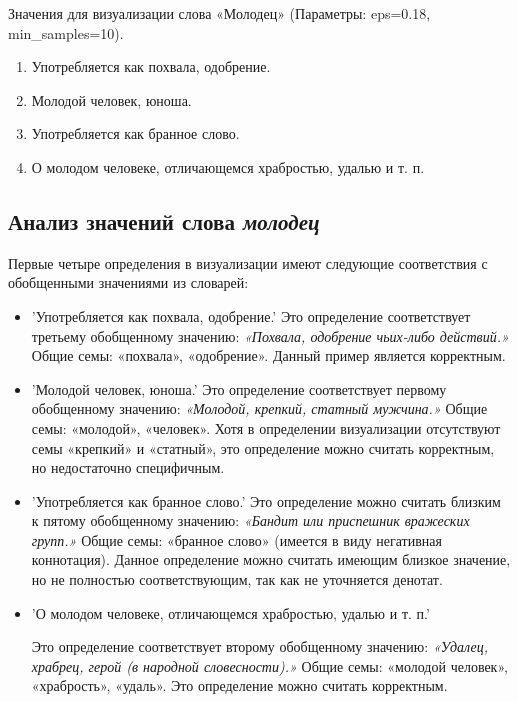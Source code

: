 Значения для визуализации слова «Молодец» (Параметры: eps=0.18, min\_samples=10).

\begin{enumerate}
    \item Употребляется как похвала, одобрение.
    \item Молодой человек, юноша.
    \item Употребляется как бранное слово.
    \item О молодом человеке, отличающемся храбростью, удалью и т. п.
\end{enumerate}

\subsection*{Анализ значений слова \textit{молодец}}

Первые четыре определения в визуализации имеют следующие соответствия с обобщенными значениями из словарей:

\begin{itemize}
    \item ’Употребляется как похвала, одобрение.’
Это определение соответствует третьему обобщенному значению:
\textit{«Похвала, одобрение чьих-либо действий.»} Общие семы: «похвала», «одобрение». Данный пример является корректным.

    \item ’Молодой человек, юноша.’
    Это определение соответствует первому обобщенному значению:
    \textit{«Молодой, крепкий, статный мужчина.»}
    Общие семы: «молодой», «человек».
    Хотя в определении визуализации отсутствуют семы «крепкий» и «статный», это определение можно считать корректным, но недостаточно специфичным.

    \item ’Употребляется как бранное слово.’
    Это определение можно считать близким к пятому обобщенному значению:
    \textit{«Бандит или приспешник вражеских групп.»}
    Общие семы: «бранное слово» (имеется в виду негативная коннотация).
    Данное определение можно считать имеющим близкое значение, но не полностью соответствующим,
так как не уточняется денотат.

    \item ’О молодом человеке, отличающемся храбростью, удалью и т. п.’

    Это определение соответствует второму обобщенному значению:
    \textit{«Удалец, храбрец, герой (в народной словесности).»}
    Общие семы: «молодой человек», «храбрость», «удаль».
    Это определение можно считать корректным.

\end{itemize}

